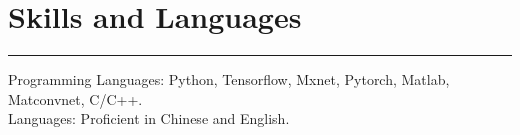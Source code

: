 \documentclass[10pt,letterpaper]{article}
\begin{document}
\section*{Skills and Languages} \vspace{-8pt}
\hrule \vspace{10pt}
{Programming Languages:} Python, Tensorflow, Mxnet, Pytorch, Matlab, Matconvnet, C/C++.\\
{Languages:} Proficient in Chinese and English.


\end{document}
